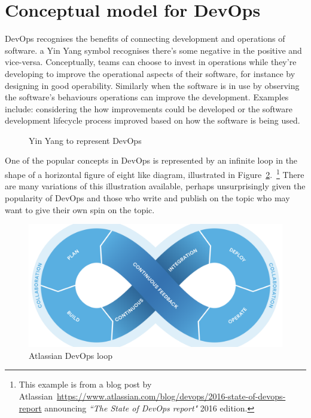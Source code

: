 \section{Conceptual model for DevOps}
DevOps recognises the benefits of connecting development and operations of software. a Yin Yang symbol recognises there's some negative in the positive and vice-versa. Conceptually, teams can choose to invest in operations while they're developing to improve the operational aspects of their software, for instance by designing in good operability. Similarly when the software is in use by observing the software's behaviours operations can improve the development. Examples include: considering the how improvements could be developed or the software development lifecycle process improved based on how the software is being used.

\begin{figure}[ht]
    \centering
    
    \caption{Yin Yang to represent DevOps}
    \label{fig:yinyang_for_devops}
\end{figure}



One of the popular concepts in DevOps is represented by an infinite loop in the shape of a horizontal figure of eight like diagram, illustrated in Figure~\ref{fig:atlassian-state-of-devops-report-2016-devopsloop}.~\footnote{This example is from a blog post by Atlassian~\url{https://www.atlassian.com/blog/devops/2016-state-of-devops-report} announcing \emph{``The State of DevOps report"} 2016 edition.} There are many variations of this illustration available, perhaps unsurprisingly given the popularity of DevOps and those who write and publish on the topic who may want to give their own spin on the topic.

\begin{figure}[ht!]
    \centering
    \includegraphics[width=13cm]{images/atlassian/atlassian-state-of-devops-report-2016-devopsloop.png}
    \caption{Atlassian DevOps loop}
    \label{fig:atlassian-state-of-devops-report-2016-devopsloop}
\end{figure}



